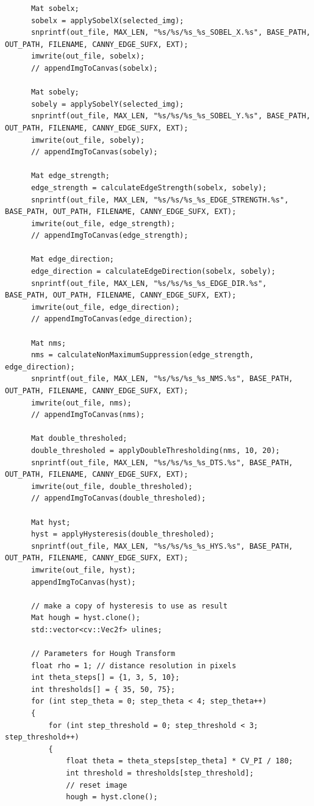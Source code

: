 \documentclass[12pt,a4paper]{report}
\begin{document}
\begin{lstlisting}
      Mat sobelx;
      sobelx = applySobelX(selected_img);
      snprintf(out_file, MAX_LEN, "%s/%s/%s_%s_SOBEL_X.%s", BASE_PATH, OUT_PATH, FILENAME, CANNY_EDGE_SUFX, EXT);
      imwrite(out_file, sobelx);
      // appendImgToCanvas(sobelx);
  
      Mat sobely;
      sobely = applySobelY(selected_img);
      snprintf(out_file, MAX_LEN, "%s/%s/%s_%s_SOBEL_Y.%s", BASE_PATH, OUT_PATH, FILENAME, CANNY_EDGE_SUFX, EXT);
      imwrite(out_file, sobely);
      // appendImgToCanvas(sobely);
  
      Mat edge_strength;
      edge_strength = calculateEdgeStrength(sobelx, sobely);
      snprintf(out_file, MAX_LEN, "%s/%s/%s_%s_EDGE_STRENGTH.%s", BASE_PATH, OUT_PATH, FILENAME, CANNY_EDGE_SUFX, EXT);
      imwrite(out_file, edge_strength);
      // appendImgToCanvas(edge_strength);
  
      Mat edge_direction;
      edge_direction = calculateEdgeDirection(sobelx, sobely);
      snprintf(out_file, MAX_LEN, "%s/%s/%s_%s_EDGE_DIR.%s", BASE_PATH, OUT_PATH, FILENAME, CANNY_EDGE_SUFX, EXT);
      imwrite(out_file, edge_direction);
      // appendImgToCanvas(edge_direction);
  
      Mat nms;
      nms = calculateNonMaximumSuppression(edge_strength, edge_direction);
      snprintf(out_file, MAX_LEN, "%s/%s/%s_%s_NMS.%s", BASE_PATH, OUT_PATH, FILENAME, CANNY_EDGE_SUFX, EXT);
      imwrite(out_file, nms);
      // appendImgToCanvas(nms);
  
      Mat double_thresholed;
      double_thresholed = applyDoubleThresholding(nms, 10, 20);
      snprintf(out_file, MAX_LEN, "%s/%s/%s_%s_DTS.%s", BASE_PATH, OUT_PATH, FILENAME, CANNY_EDGE_SUFX, EXT);
      imwrite(out_file, double_thresholed);
      // appendImgToCanvas(double_thresholed);
  
      Mat hyst;
      hyst = applyHysteresis(double_thresholed);
      snprintf(out_file, MAX_LEN, "%s/%s/%s_%s_HYS.%s", BASE_PATH, OUT_PATH, FILENAME, CANNY_EDGE_SUFX, EXT);
      imwrite(out_file, hyst);
      appendImgToCanvas(hyst);
  
      // make a copy of hysteresis to use as result
      Mat hough = hyst.clone();
      std::vector<cv::Vec2f> ulines;
  
      // Parameters for Hough Transform
      float rho = 1; // distance resolution in pixels
      int theta_steps[] = {1, 3, 5, 10};
      int thresholds[] = { 35, 50, 75};
      for (int step_theta = 0; step_theta < 4; step_theta++)
      {
          for (int step_threshold = 0; step_threshold < 3; step_threshold++)
          {
              float theta = theta_steps[step_theta] * CV_PI / 180;
              int threshold = thresholds[step_threshold];
              // reset image
              hough = hyst.clone();
  

\end{lstlisting}
\end{document}

